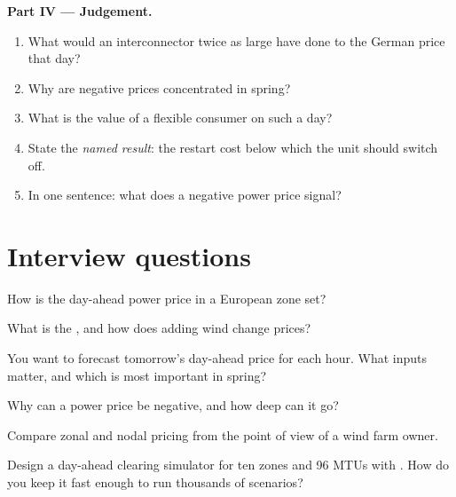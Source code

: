 \begin{problem}
\medskip\noindent\textbf{Part IV --- Judgement.}
\begin{enumerate}[resume]
\item What would an interconnector twice as large have done to the German price that day?
\item Why are negative prices concentrated in spring?
\item What is the value of a flexible consumer on such a day?
\item State the \emph{named result}: the restart cost below which the unit should switch off.
\item In one sentence: what does a negative power price signal?
\end{enumerate}
\end{problem}

\section{Interview questions}

\begin{interviewq}\label{iq:m3:power-markets-design:1}
How is the day-ahead power price in a European zone set?
\end{interviewq}

\begin{interviewq}\label{iq:m3:power-markets-design:2}
What is the , and how does adding wind change prices?
\end{interviewq}

\begin{interviewq}\label{iq:m3:power-markets-design:3}
You want to forecast tomorrow's day-ahead price for each hour. What inputs matter, and
which is most important in spring?
\end{interviewq}

\begin{interviewq}\label{iq:m3:power-markets-design:4}
Why can a power price be negative, and how deep can it go?
\end{interviewq}

\begin{interviewq}\label{iq:m3:power-markets-design:5}
Compare zonal and nodal pricing from the point of view of a wind farm owner.
\end{interviewq}

\begin{interviewq}\label{iq:m3:power-markets-design:6}
Design a day-ahead clearing simulator for ten zones and 96 MTUs with . How do
you keep it fast enough to run thousands of scenarios?
\end{interviewq}

